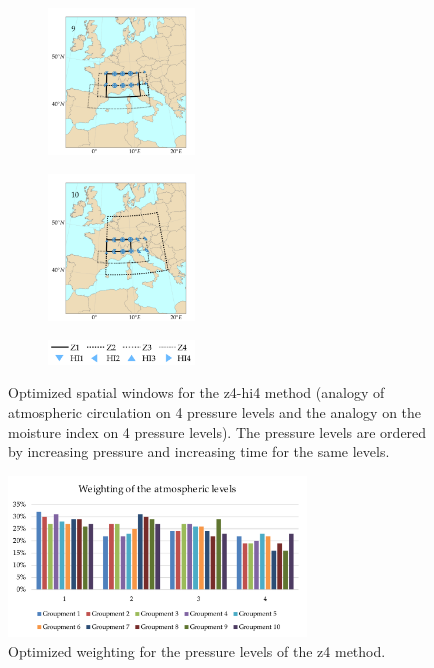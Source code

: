 \documentclass{ametsoc}
\begin{document}
\begin{figure}[htb]
\begin{subfigure}{.5\columnwidth}
		\centering
		\includegraphics[width=3.9cm]{figures/spatial_win_z4-hi4/Spatial_windows_9.png}
	\end{subfigure}%
	\begin{subfigure}{.5\columnwidth}
		\centering
		\includegraphics[width=3.9cm]{figures/spatial_win_z4-hi4/Spatial_windows_10.png}
	\end{subfigure}
	\begin{subfigure}{.5\columnwidth}
		\centering
		\includegraphics[width=3.9cm]{figures/spatial_win_z4-hi4/legend.png}
	\end{subfigure}
	\caption{Optimized spatial windows for the z4-hi4 method (analogy of atmospheric circulation on 4 pressure levels and the analogy on the moisture index on 4 pressure levels). The pressure levels are ordered by increasing pressure and increasing time for the same levels.}
	\label{fig:spatial_windows_z4-hi4}
\end{figure}


\begin{figure}[htb]
	\centerline{\includegraphics[width=7.9cm]{figures/figure_levels_weights.pdf}}
	\caption{Optimized weighting for the pressure levels of the z4 method.}
	\label{fig:levels_weights}
\end{figure}
\end{document}
